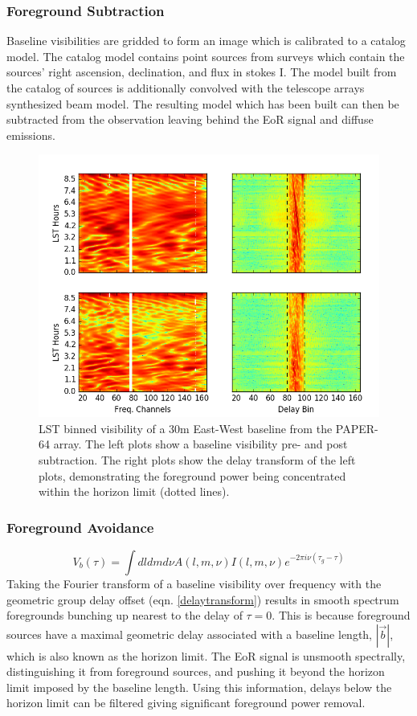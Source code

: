 \documentclass[a0,landscape]{a0poster}
\begin{document}
\begin{multicols}{4}
\subsubsection*{Foreground Subtraction}
Baseline visibilities are gridded to form an image which is calibrated to a catalog model. The catalog model contains point sources from surveys which contain the sources' right ascension, declination, and flux in stokes I. The model built from the catalog of sources is additionally convolved with the telescope arrays synthesized beam model. The resulting model which has been built can then be subtracted from the observation leaving behind the EoR signal and diffuse emissions.
\begin{figure}[H]
\centering
\label{foregroundsrcs}
\includegraphics[width=0.6\linewidth]{figures/foresub.png}
\caption{LST binned visibility of a 30m East-West baseline from the PAPER-64 array. The left plots show a baseline visibility pre- and post subtraction. The right plots show the delay transform of the left plots, demonstrating the foreground power being concentrated within the horizon limit (dotted lines).}
\end{figure}


\subsubsection*{Foreground Avoidance}
\begin{equation}
\label{delaytransform}
V_b(\tau) = \int dl dm d\nu A(l,m,\nu)I(l,m,\nu)e^{-2\pi i\nu(\tau_g -\tau)}
\end{equation}
Taking the Fourier transform of a baseline visibility over frequency with the geometric group delay offset (eqn. \ref{delaytransform}) results in smooth spectrum foregrounds bunching up nearest to the delay of $\tau = 0$. This is because foreground sources have a maximal geometric delay associated with a baseline length, $|\vec{b}|$, which is also known as the horizon limit. The EoR signal is unsmooth spectrally, distinguishing it from foreground sources, and pushing it beyond the horizon limit imposed by the baseline length. Using this information, delays below the horizon limit can be filtered giving significant foreground power removal.


\end{multicols}
\end{document}
